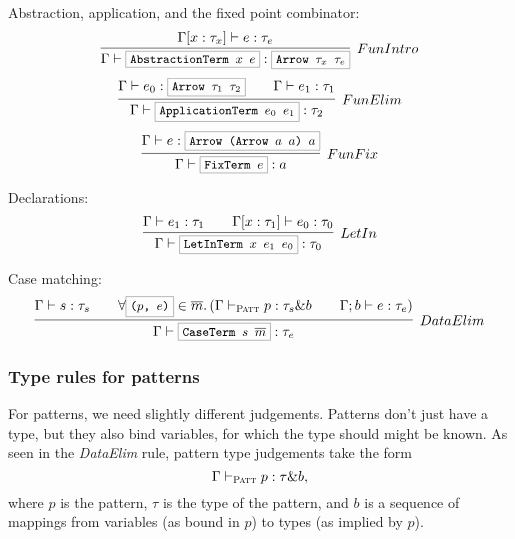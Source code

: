 \documentclass[a4paper]{scrartcl}
\newcommand{\hsterm}[1]{%
    \setlength{\fboxsep}{3pt}%
    \setlength{\fboxrule}{0.2pt}%
    \fbox{\texttt{\small #1}}}
\renewcommand{\vec}[1]{\overline{#1}}
\begin{document}
Abstraction, application, and the fixed point combinator:
\begin{equation*}
\infer[FunIntro]%
    {\Gamma \vdash \hsterm{AbstractionTerm \ensuremath{x} \ensuremath{e}} : \hsterm{Arrow \ensuremath{\tau_x} \ensuremath{\tau_e}}}%
    {\Gamma [x : \tau_x] \vdash e : \tau_e}%
\end{equation*}\begin{equation*}
\infer[FunElim]%
    {\Gamma \vdash \hsterm{ApplicationTerm \ensuremath{e_0} \ensuremath{e_1}} : \tau_2}%
    {\Gamma \vdash e_0 : \hsterm{Arrow \ensuremath{\tau_1} \ensuremath{\tau_2}} \qquad \Gamma \vdash e_1 : \tau_1}%
\end{equation*}\begin{equation*}
\infer[FunFix]%
    {\Gamma \vdash \hsterm{FixTerm \ensuremath{e}} : \ensuremath{a}}%
    {\Gamma \vdash \ensuremath{e} : \hsterm{Arrow (Arrow \ensuremath{a} \ensuremath{a}) \ensuremath{a}}}
\end{equation*}

Declarations:
\begin{align*}
\infer[LetIn]%
    {\Gamma \vdash \hsterm{LetInTerm \ensuremath{x} \ensuremath{e_1} \ensuremath{e_0}} : \tau_0}%
    {\Gamma \vdash e_1 : \tau_1 \qquad \Gamma [x : \tau_1] \vdash e_0 : \tau_0}
\end{align*}

Case matching:
\begin{align*}
\infer[DataElim]%
    {\Gamma \vdash \hsterm{CaseTerm \ensuremath{s} \ensuremath{\vec{m}}} : \tau_e}%
    {\Gamma \vdash s : \tau_s
    \qquad
    \forall \hsterm{(\ensuremath{p}, \ensuremath{e})} \in \vec{m}.\left(
        \Gamma \vdash_\textsc{Patt} p : \tau_s \& b \qquad
        \Gamma; b \vdash e : \tau_e
    \right)}
\end{align*}

\subsubsection{Type rules for patterns}
For patterns, we need slightly different judgements. Patterns don't just have
a type, but they also bind variables, for which the type should might be known.
As seen in the \textit{DataElim} rule, pattern type judgements take the form
\begin{equation*}
    \Gamma \vdash_\textsc{Patt} p : \tau \& b,
\end{equation*}
where $p$ is the pattern, $\tau$ is the type of the pattern, and $b$ is
a sequence of mappings from variables (as bound in $p$) to types (as implied
by $p$).
\end{document}
